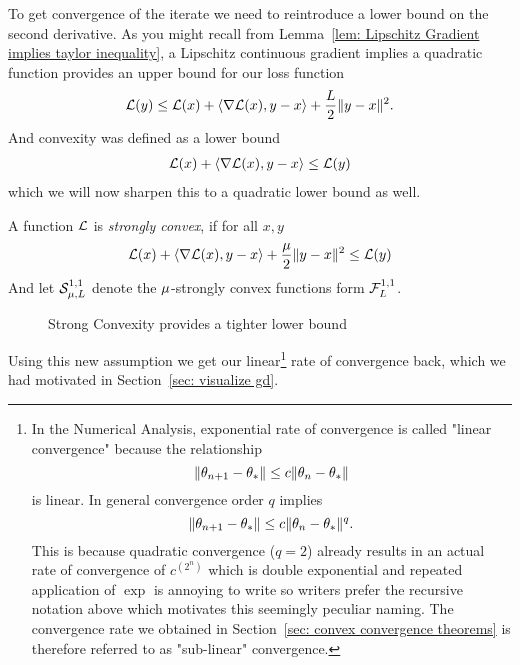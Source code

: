 To get convergence of the iterate we need to reintroduce a lower bound on
the second derivative. As you might recall from Lemma~\ref{lem: Lipschitz
Gradient implies taylor inequality}, a Lipschitz continuous gradient implies
a quadratic function provides an upper bound for our loss function
%
\begin{align}\label{eq: upper bound}
	\mathcal{L}(y) \le \mathcal{L}(x) + \langle \nabla \mathcal{L}(x), y-x\rangle + \frac{L}{2}\|y-x\|^2.
\end{align}
%
And convexity was defined as a lower bound
%
\begin{align*}
	\mathcal{L}(x) + \langle \nabla \mathcal{L}(x), y-x\rangle \le \mathcal{L}(y)
\end{align*}
%
which we will now sharpen this to a quadratic lower bound as well.
%
\begin{definition}\label{def: strong convexity}
	A function \(\mathcal{L}\) is \emph{strongly convex}, if for all \(x,y\)
	\begin{align*}
		\mathcal{L}(x) + \langle \nabla \mathcal{L}(x), y-x\rangle + \frac{\mu}{2}\|y-x\|^2 \le \mathcal{L}(y)
	\end{align*}
	And let \(\mathcal{S}^{1,1}_{{\mu},{L}}\) denote the \(\mu\)-strongly convex
	functions form \(\mathcal{F}^{1,1}_{L}\).
\end{definition}
%
\begin{figure}[h]
	\centering
	\def\svgwidth{1\textwidth}
	
	\caption{Strong Convexity provides a tighter lower bound}
	\label{fig: visualize strong convexity}
\end{figure}
%
Using this new assumption we get our linear\footnote{
	In the Numerical Analysis, exponential rate of
	convergence is called "linear convergence" because the relationship
	\[
		\|\theta_{n+1} - \theta_*\| \le c \|\theta_n - \theta_*\|
	\]
	is linear. In
	general convergence order \(q\) implies 
	\[
		\|\theta_{n+1} -\theta_*\| \le c\|\theta_n - \theta_*\|^q.
	\]
	This is because quadratic convergence (\(q=2\)) already results in an actual
	rate of convergence of \(c^{\left(2^n\right)}\) which is double exponential and
	repeated application of \(\exp\) is annoying to write so writers prefer the
	recursive notation above which motivates this seemingly peculiar naming.
	The convergence rate we obtained in Section~\ref{sec: convex convergence theorems}
	is therefore referred to as "sub-linear" convergence.
}
rate of convergence back, which we had motivated in Section~\ref{sec: visualize gd}. 
%
